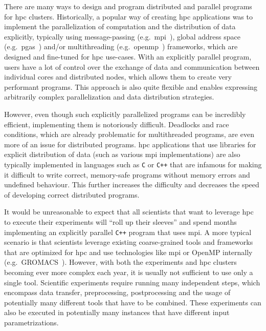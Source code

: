There are many ways to design and program distributed and parallel programs for
\gls{hpc} clusters. Historically, a popular way of creating \gls{hpc}
applications was to implement the parallelization of computation and the distribution of data
explicitly, typically using message-passing (e.g.\ \gls{mpi}~\cite{mpi}),
global address space (e.g.\ \gls{pgas}~\cite{pgas}) and/or multithreading
(e.g.\ \gls{openmp}~\cite{openmp}) frameworks, which are designed and fine-tuned
for \gls{hpc} use-cases. With an explicitly parallel program, users have a lot of
control over the exchange of data and communication between individual cores and distributed nodes,
which allows them to create very performant programs. This approach is also quite flexible and
enables expressing arbitrarily complex parallelization and data distribution strategies.

However, even though such explicitly parallelized programs can be incredibly efficient,
implementing them is notoriously difficult. Deadlocks and race conditions, which are already
problematic for multithreaded programs, are even more of an issue for distributed programs.
\gls{hpc} applications that use libraries for explicit distribution of data (such as
various \gls{mpi} implementations) are also typically implemented in languages such as
\texttt{C} or \texttt{C++} that are infamous for making it difficult to write
correct, memory-safe programs without memory errors and undefined behaviour. This further increases
the difficulty and decreases the speed of developing correct distributed programs.

It would be unreasonable to expect that all scientists that want to leverage \gls{hpc}
to execute their experiments will ``roll up their sleeves'' and spend months implementing an
explicitly parallel \texttt{C++} program that uses \gls{mpi}. A more typical
scenario is that scientists leverage existing coarse-grained tools and frameworks that are
optimized for \gls{hpc} and use technologies like \gls{mpi} or OpenMP
internally (e.g.\ GROMACS~\cite{gromacs}). However, with both the experiments and
\gls{hpc} clusters becoming ever more complex each year, it is usually not sufficient
to use only a single tool. Scientific experiments require running many independent steps, which
encompass data transfer, preprocessing, postprocessing and the usage of potentially many different
tools that have to be combined. These experiments can also be executed in potentially many
instances that have different input parametrizations.

